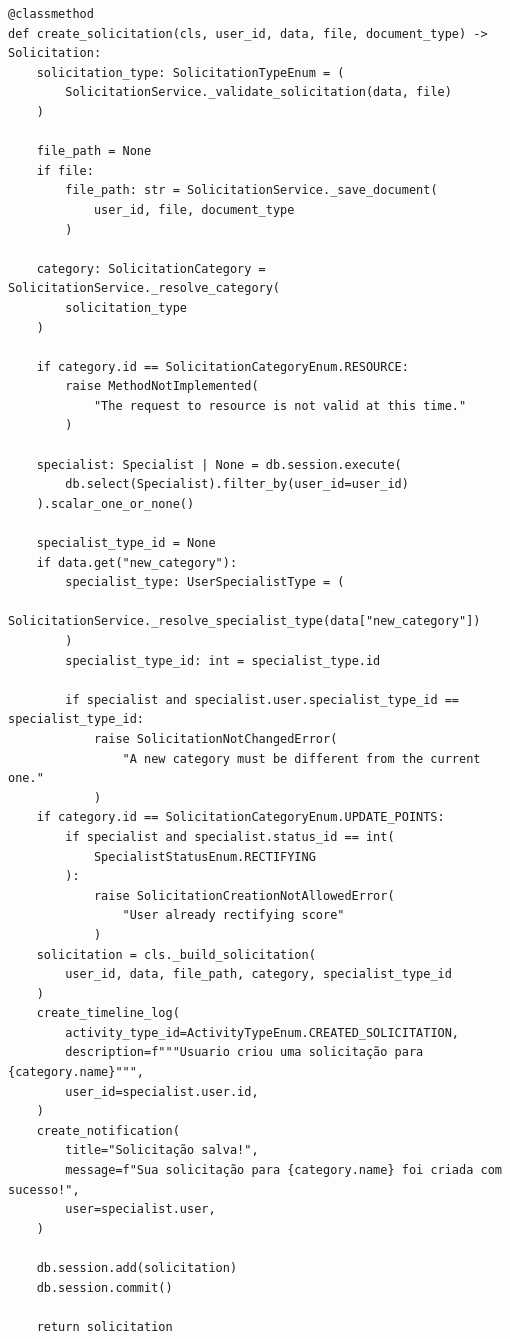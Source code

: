 \begin{algorithm}[htbp]
\caption{Lógica de criação de uma solicitação no serviço.}
\label{alg:servico-criacao}
\begin{verbatim}
@classmethod
def create_solicitation(cls, user_id, data, file, document_type) -> Solicitation:
    solicitation_type: SolicitationTypeEnum = (
        SolicitationService._validate_solicitation(data, file)
    )

    file_path = None
    if file:
        file_path: str = SolicitationService._save_document(
            user_id, file, document_type
        )

    category: SolicitationCategory = SolicitationService._resolve_category(
        solicitation_type
    )

    if category.id == SolicitationCategoryEnum.RESOURCE:
        raise MethodNotImplemented(
            "The request to resource is not valid at this time."
        )

    specialist: Specialist | None = db.session.execute(
        db.select(Specialist).filter_by(user_id=user_id)
    ).scalar_one_or_none()

    specialist_type_id = None
    if data.get("new_category"):
        specialist_type: UserSpecialistType = (
            SolicitationService._resolve_specialist_type(data["new_category"])
        )
        specialist_type_id: int = specialist_type.id

        if specialist and specialist.user.specialist_type_id == specialist_type_id:
            raise SolicitationNotChangedError(
                "A new category must be different from the current one."
            )
    if category.id == SolicitationCategoryEnum.UPDATE_POINTS:
        if specialist and specialist.status_id == int(
            SpecialistStatusEnum.RECTIFYING
        ):
            raise SolicitationCreationNotAllowedError(
                "User already rectifying score"
            )
    solicitation = cls._build_solicitation(
        user_id, data, file_path, category, specialist_type_id
    )
    create_timeline_log(
        activity_type_id=ActivityTypeEnum.CREATED_SOLICITATION,
        description=f"""Usuario criou uma solicitação para {category.name}""",
        user_id=specialist.user.id,
    )
    create_notification(
        title="Solicitação salva!",
        message=f"Sua solicitação para {category.name} foi criada com sucesso!",
        user=specialist.user,
    )

    db.session.add(solicitation)
    db.session.commit()

    return solicitation
\end{verbatim}
\end{algorithm}

